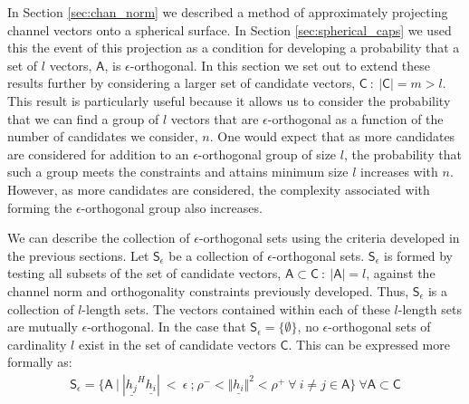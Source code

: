 In Section \ref{sec:chan_norm} we described a method of approximately projecting channel vectors onto a spherical surface. In Section \ref{sec:spherical_caps} we used this the event of this projection as a condition for developing a probability that a set of $l$ vectors, $\mathsf{A}$, is $\epsilon$-orthogonal. In this section we set out to extend these results further by considering a larger set of candidate vectors, $\mathsf{C} \ :\ \vert \mathsf{C} \vert = m >l$. This result is particularly useful because it allows us to consider the probability that we can find a group of $l$ vectors that are $\epsilon$-orthogonal as a function of the number of candidates we consider, $n$. One would expect that as more candidates are considered for addition to an $\epsilon$-orthogonal group of size $l$, the probability that such a group meets the constraints and attains minimum size $l$ increases with $n$. However, as more candidates are considered, the complexity associated with forming the $\epsilon$-orthogonal group also increases. 

We can describe the collection of $\epsilon$-orthogonal sets using the criteria developed in the previous sections. Let $\mathsf{S}_\epsilon$ be a collection of $\epsilon$-orthogonal sets. $\mathsf{S}_\epsilon$ is formed by testing all subsets of the set of candidate vectors, $\mathsf{A}\subset\mathsf{C}\ : \ \vert \mathsf{A} \vert = l$, against the channel norm and orthogonality constraints previously developed. Thus, $\mathsf{S}_\epsilon$ is a collection of $l$-length sets. The vectors contained within each of these $l$-length sets are mutually $\epsilon$-orthogonal. In the case that $\mathsf{S}_\epsilon = \lbrace \emptyset \rbrace$, no $\epsilon$-orthogonal sets of cardinality $l$ exist in the set of candidate vectors $\mathsf{C}$. This can be expressed more formally as:
 \begin{equation}\label{eq:S_e}
    \begin{aligned}
        \mathsf{S}_\epsilon = \lbrace \mathsf{A}\ \big|\ | \underline{h_j}^H\underline{h_i} |\ <\ \epsilon \ \text{;} \ \rho^-<\Vert \underline{h_i} \Vert^2 < \rho^+\ \forall \ i \neq j \in \mathsf{A} \rbrace \ \forall \mathsf{A}\subset \mathsf{C}
    \end{aligned}
\end{equation}


